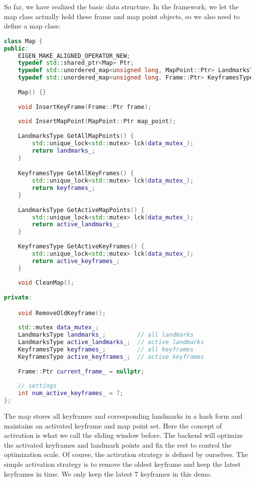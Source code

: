 So far, we have realized the basic data structure. In the framework, we let the map class actually hold these frame and map point objects, so we also need to define a map class:

\begin{lstlisting}[language=c++,caption=slambook2/ch13/include/myslam/map.h]
class Map {
public:
	EIGEN_MAKE_ALIGNED_OPERATOR_NEW;
	typedef std::shared_ptr<Map> Ptr;
	typedef std::unordered_map<unsigned long, MapPoint::Ptr> LandmarksType;
	typedef std::unordered_map<unsigned long, Frame::Ptr> KeyframesType;
	
	Map() {}
	
	void InsertKeyFrame(Frame::Ptr frame);
	
	void InsertMapPoint(MapPoint::Ptr map_point);
	
	LandmarksType GetAllMapPoints() {
		std::unique_lock<std::mutex> lck(data_mutex_);
		return landmarks_;
	}

	KeyframesType GetAllKeyFrames() {
		std::unique_lock<std::mutex> lck(data_mutex_);
		return keyframes_;
	}
	
	LandmarksType GetActiveMapPoints() {
		std::unique_lock<std::mutex> lck(data_mutex_);
		return active_landmarks_;
	}
	
	KeyframesType GetActiveKeyFrames() {
		std::unique_lock<std::mutex> lck(data_mutex_);
		return active_keyframes_;
	}
	
	void CleanMap();
	
private:

	void RemoveOldKeyframe();
	
	std::mutex data_mutex_;
	LandmarksType landmarks_;         // all landmarks
	LandmarksType active_landmarks_;  // active landmarks
	KeyframesType keyframes_;         // all keyframes
	KeyframesType active_keyframes_;  // active keyframes
	
	Frame::Ptr current_frame_ = nullptr;
	
	// settings
	int num_active_keyframes_ = 7;  
};
\end{lstlisting}
The map stores all keyframes and corresponding landmarks in a hash form and maintains an activated keyframe and map point set. Here the concept of activation is what we call the sliding window before. The backend will optimize the activated keyframes and landmark points and fix the rest to control the optimization scale. Of course, the activation strategy is defined by ourselves. The simple activation strategy is to remove the oldest keyframe and keep the latest keyframes in time. We only keep the latest 7 keyframes in this demo.

